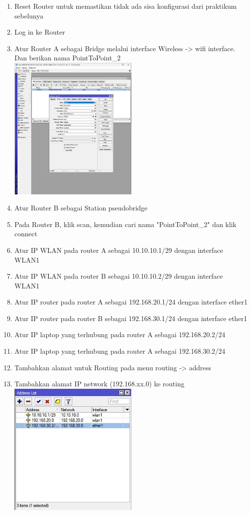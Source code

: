 \begin{enumerate}
	\item Reset Router untuk memastikan tidak ada sisa konfigurasi dari praktikum sebelunya
	\item Log in ke Router
	\item Atur Router A sebagai Bridge melalui interface Wireless -> wifi interface. Dan berikan nama PointToPoint\_2\\
	\includegraphics[width=0.5\textwidth]{p4/img/bridge.jpg}
	\item Atur Router B sebagai Station pseudobridge
	\item Pada Router B, klik scan, kemudian cari nama "PointToPoint\_2" dan klik connect
	\item Atur IP WLAN pada router A sebagai 10.10.10.1/29 dengan interface WLAN1
	\item Atur IP WLAN pada router B sebagai 10.10.10.2/29 dengan interface WLAN1
	\item Atur IP router pada router A sebagai 192.168.20.1/24 dengan interface ether1
	\item Atur IP router pada router B sebagai 192.168.30.1/24 dengan interface ether1
	\item Atur IP laptop yang terhubung pada router A sebagai 192.168.20.2/24
	\item Atur IP laptop yang terhubung pada router A sebagai 192.168.30.2/24
	\item Tambahkan alamat untuk Routing pada menu routing -> address\\
	\item Tambahkan alamat IP network (192.168.xx.0) ke routing\\
	\includegraphics[width=0.5\textwidth]{p4/img/address.jpg}

\end{enumerate}
